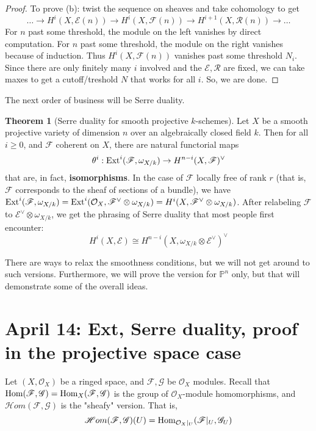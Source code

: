 \documentclass[10pt,reqno]{amsart}
\theoremstyle{definition}
\newtheorem{theorem}{Theorem}
\theoremstyle{remark}
\numberwithin{equation}{section}
\numberwithin{theorem}{section}
\newcommand{\OO}{{\mathcal O}}
\newcommand{\Hom}{\textup{Hom}}
\newcommand{\Ext}{\textup{Ext}}
\newcommand{\scrHom}{\mathscr{H}om}
\newcommand{\FF}{{\mathscr F}}
\newcommand{\EE}{{\mathscr E}}
\newcommand{\RR}{{\mathscr R}}
\newcommand{\GG}{{\mathscr G}}
\newcommand{\PP}{{\mathbb P}}
\begin{document}
\begin{proof}
To prove (b): twist the sequence on sheaves and take cohomology to get
\[\dots \to H^i(X,\EE(n)) \to H^i(X,\FF(n)) \to H^{i+1}(X,\RR(n)) \to \dots\]
For $n$ past some threshold, the module on the left vanishes by direct computation. For $n$ past some threshold, the module on the right vanishes because of induction. Thus $H^i(X,\FF(n))$ vanishes past some threshold $N_i$. Since there are only finitely many $i$ involved and the $\EE,\RR$ are fixed, we can take maxes to get a cutoff/treshold $N$ that works for all $i$. So, we are done.
\end{proof}

The next order of business will be Serre duality.

\begin{theorem}[Serre duality for smooth projective $k$-schemes] Let $X$ be a smooth projective variety of dimension $n$ over an algebraically closed field $k$. Then for all $i \ge 0$, and $\FF$ coherent on $X$, there are natural functorial maps
\[\theta^i: \Ext^i(\FF,\omega_{X/k}) \to H^{n-i}(X,\FF)^{\vee}\]
that are, in fact, \textbf{isomorphisms}. In the case of $\FF$ locally free of rank $r$ (that is, $\FF$ corresponds to the sheaf of sections of a bundle), we have $\Ext^i(\FF,\omega_{X/k}) = \Ext^i(\OO_X, \FF^{\vee} \otimes \omega_{X/k}) = H^i(X, \FF^{\vee} \otimes \omega_{X/k})$. After relabeling $\FF$ to $\EE^{\vee} \otimes \omega_{X/k}$, we get the phrasing of Serre duality that most people first encounter:
\[H^i(X,\EE) \cong H^{n-i}(X,\omega_{X/k} \otimes \EE^{\vee})^{\vee}\]
\end{theorem}

There are ways to relax the smoothness conditions, but we will not get around to such versions. Furthermore, we will prove the version for $\PP^n$ only, but that will demonstrate some of the overall ideas. 

\section{April 14: Ext, Serre duality, proof in the projective space case}

Let $(X,\OO_X)$ be a ringed space, and $\FF,\GG$ be $\OO_X$ modules. Recall that $\Hom(\FF,\GG) = \Hom_X(\FF,\GG)$ is the group of $\OO_X$-module homomorphisms, and $\scrHom(\FF,\GG)$ is the "sheafy" version. That is, 
\[\scrHom(\FF,\GG)(U) = \Hom_{\OO_X |_U}(\FF|_U, \GG_U)\]
\end{document}
